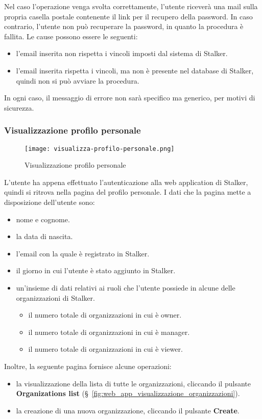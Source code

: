 \documentclass[../manuale-utente.tex]{subfiles}
\begin{document}
Nel caso l'operazione venga svolta correttamente, l'utente riceverà una mail sulla propria casella postale contenente il link per il recupero della password.
In caso contrario, l'utente non può recuperare la password, in quanto la procedura è fallita.
Le cause possono essere le seguenti:
\begin{itemize}
    \item l'email inserita non rispetta i vincoli imposti dal sistema di Stalker.
    \item l'email inserita rispetta i vincoli, ma non è presente nel database di Stalker, quindi non si può avviare la procedura.
\end{itemize}
In ogni caso, il messaggio di errore non sarà specifico ma generico, per motivi di sicurezza.

\subsubsection{Visualizzazione profilo personale}%
\label{subs:visualizzazione_profilo_personale}

\begin{figure}[H]
    \centering
    \texttt{[image: visualizza-profilo-personale.png]}
    \caption{Visualizzazione profilo personale}%
    \label{fig:web_app_visualizzazione_profilo_personale}
\end{figure}
L'utente ha appena effettuato l'autenticazione alla web application di Stalker, quindi si ritrova nella pagina del profilo personale.
I dati che la pagina mette a disposizione dell'utente sono:
\begin{itemize}
    \item nome e cognome.
    \item la data di nascita.
    \item l'email con la quale è registrato in Stalker.
    \item il giorno in cui l'utente è stato aggiunto in Stalker.
    \item un'insieme di dati relativi ai ruoli che l'utente possiede in alcune delle organizzazioni di Stalker.
    \begin{itemize}
        \item il numero totale di organizzazioni in cui è owner.
        \item il numero totale di organizzazioni in cui è manager.
        \item il numero totale di organizzazioni in cui è viewer.
    \end{itemize}
\end{itemize}
Inoltre, la seguente pagina fornisce alcune operazioni:
\begin{itemize}
    \item la visualizzazione della lista di tutte le organizzazioni, cliccando il pulsante \textbf{Organizations list} (§~\ref{fig:web_app_visualizzazione_organizzazioni}).
    \item la creazione di una nuova organizzazione, cliccando il pulsante \textbf{Create}.
\end{itemize}
\end{document}
